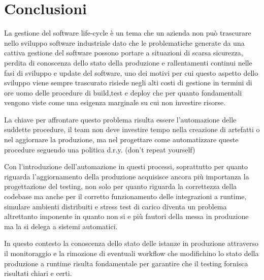\chapter{Conclusioni}

La gestione del software life-cycle è un tema che un azienda non può trascurare nello sviluppo software industriale dato che le problematiche generate da una cattiva gestione del software possono portare a situazioni di scarsa sicurezza, perdita di conoscenza dello stato della produzione e rallentamenti continui nelle fasi di sviluppo e update del software, uno dei motivi per cui questo aspetto dello sviluppo viene sempre trascurato risiede negli alti costi di gestione in termini di ore uomo delle procedure di build,test e deploy che per quanto fondamentali vengono viste come una esigenza marginale su cui non investire risorse.

La chiave per affrontare questo problema risulta essere l'automazione delle suddette procedure, il team non deve investire tempo nella creazione di artefatti o nel aggiornare la produzione, ma nel progettare come automatizzare queste procedure seguendo una politica d.r.y. (don't repeat yourself)

Con l'introduzione dell'automazione in  questi processi, soprattutto per quanto riguarda l'aggiornamento della produzione acquisisce ancora più importanza la progettazione del testing, non solo per quanto riguarda la correttezza della codebase ma anche per il corretto funzionamento delle integrazioni a runtime, simulare ambienti distribuiti e stress test di carico diventa un problema altrettanto imponente in quanto non si e più fautori della messa in produzione ma la si delega a sistemi automatici.

In questo contesto la conoscenza dello stato delle istanze in produzione attraverso il monitoraggio e la rimozione di eventuali workflow che modifichino lo stato della produzione a runtime risulta fondamentale per garantire che il testing fornisca risultati chiari e certi.

